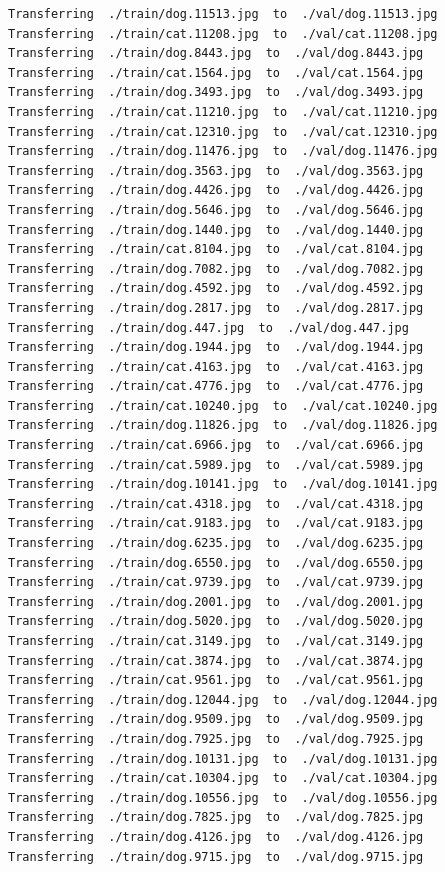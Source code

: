 \documentclass[]{book}
\theoremstyle{definition}
\theoremstyle{definition}
\theoremstyle{definition}
\theoremstyle{remark}
\begin{document}
\begin{verbatim}
Transferring  ./train/dog.11513.jpg  to  ./val/dog.11513.jpg
Transferring  ./train/cat.11208.jpg  to  ./val/cat.11208.jpg
Transferring  ./train/dog.8443.jpg  to  ./val/dog.8443.jpg
Transferring  ./train/cat.1564.jpg  to  ./val/cat.1564.jpg
Transferring  ./train/dog.3493.jpg  to  ./val/dog.3493.jpg
Transferring  ./train/cat.11210.jpg  to  ./val/cat.11210.jpg
Transferring  ./train/cat.12310.jpg  to  ./val/cat.12310.jpg
Transferring  ./train/dog.11476.jpg  to  ./val/dog.11476.jpg
Transferring  ./train/dog.3563.jpg  to  ./val/dog.3563.jpg
Transferring  ./train/dog.4426.jpg  to  ./val/dog.4426.jpg
Transferring  ./train/dog.5646.jpg  to  ./val/dog.5646.jpg
Transferring  ./train/dog.1440.jpg  to  ./val/dog.1440.jpg
Transferring  ./train/cat.8104.jpg  to  ./val/cat.8104.jpg
Transferring  ./train/dog.7082.jpg  to  ./val/dog.7082.jpg
Transferring  ./train/dog.4592.jpg  to  ./val/dog.4592.jpg
Transferring  ./train/dog.2817.jpg  to  ./val/dog.2817.jpg
Transferring  ./train/dog.447.jpg  to  ./val/dog.447.jpg
Transferring  ./train/dog.1944.jpg  to  ./val/dog.1944.jpg
Transferring  ./train/cat.4163.jpg  to  ./val/cat.4163.jpg
Transferring  ./train/cat.4776.jpg  to  ./val/cat.4776.jpg
Transferring  ./train/cat.10240.jpg  to  ./val/cat.10240.jpg
Transferring  ./train/dog.11826.jpg  to  ./val/dog.11826.jpg
Transferring  ./train/cat.6966.jpg  to  ./val/cat.6966.jpg
Transferring  ./train/cat.5989.jpg  to  ./val/cat.5989.jpg
Transferring  ./train/dog.10141.jpg  to  ./val/dog.10141.jpg
Transferring  ./train/cat.4318.jpg  to  ./val/cat.4318.jpg
Transferring  ./train/cat.9183.jpg  to  ./val/cat.9183.jpg
Transferring  ./train/dog.6235.jpg  to  ./val/dog.6235.jpg
Transferring  ./train/dog.6550.jpg  to  ./val/dog.6550.jpg
Transferring  ./train/cat.9739.jpg  to  ./val/cat.9739.jpg
Transferring  ./train/dog.2001.jpg  to  ./val/dog.2001.jpg
Transferring  ./train/dog.5020.jpg  to  ./val/dog.5020.jpg
Transferring  ./train/cat.3149.jpg  to  ./val/cat.3149.jpg
Transferring  ./train/cat.3874.jpg  to  ./val/cat.3874.jpg
Transferring  ./train/cat.9561.jpg  to  ./val/cat.9561.jpg
Transferring  ./train/dog.12044.jpg  to  ./val/dog.12044.jpg
Transferring  ./train/dog.9509.jpg  to  ./val/dog.9509.jpg
Transferring  ./train/dog.7925.jpg  to  ./val/dog.7925.jpg
Transferring  ./train/dog.10131.jpg  to  ./val/dog.10131.jpg
Transferring  ./train/cat.10304.jpg  to  ./val/cat.10304.jpg
Transferring  ./train/dog.10556.jpg  to  ./val/dog.10556.jpg
Transferring  ./train/dog.7825.jpg  to  ./val/dog.7825.jpg
Transferring  ./train/dog.4126.jpg  to  ./val/dog.4126.jpg
Transferring  ./train/dog.9715.jpg  to  ./val/dog.9715.jpg

\end{verbatim}
\end{document}
